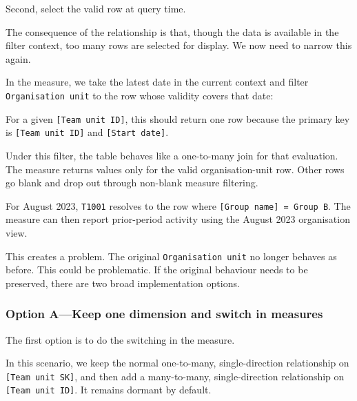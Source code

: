 \documentclass[10pt,openany,10pt]{book}
\begin{document}
Second, select the valid row at query time.

The consequence of the relationship is that, though the data is
available in the filter context, too many rows are selected for display.
We now need to narrow this again.

In the measure, we take the latest date in the current context and
filter \texttt{\textquotesingle{}Organisation\ unit\textquotesingle{}}
to the row whose validity covers that date:

\begin{Shaded}
\begin{Highlighting}[]
\CommentTok{[}\CommentTok{]}\CommentTok{[}\CommentTok{]}
\end{Highlighting}
\end{Shaded}

For a given \texttt{{[}Team\ unit\ ID{]}}, this should return one row
because the primary key is \texttt{{[}Team\ unit\ ID{]}} and
\texttt{{[}Start\ date{]}}.

Under this filter, the table behaves like a one-to-many join for that
evaluation. The measure returns values only for the valid
organisation-unit row. Other rows go blank and drop out through
non-blank measure filtering.

For August 2023, \texttt{T1001} resolves to the row where
\texttt{{[}Group\ name{]}\ =\ Group\ B}. The measure can then report
prior-period activity using the August 2023 organisation view.

This creates a problem. The original
\texttt{\textquotesingle{}Organisation\ unit\textquotesingle{}} no
longer behaves as before. This could be problematic. If the original
behaviour needs to be preserved, there are two broad implementation
options.

\subsubsection{Option A---Keep one dimension and switch in
measures}\label{option-akeep-one-dimension-and-switch-in-measures}

The first option is to do the switching in the measure.

In this scenario, we keep the normal one-to-many, single-direction
relationship on \texttt{{[}Team\ unit\ SK{]}}, and then add a
many-to-many, single-direction relationship on
\texttt{{[}Team\ unit\ ID{]}}. It remains dormant by default.
\end{document}
